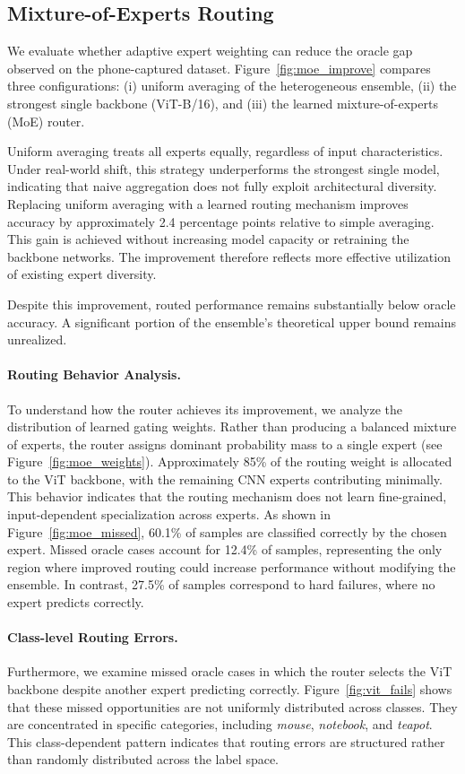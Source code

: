 \subsection{Mixture-of-Experts Routing}

We evaluate whether adaptive expert weighting can reduce the oracle gap observed on the phone-captured dataset.
Figure~\ref{fig:moe_improve} compares three configurations: (i) uniform averaging of the heterogeneous ensemble, (ii) the strongest single backbone (ViT-B/16), and (iii) the learned mixture-of-experts (MoE) router.

Uniform averaging treats all experts equally, regardless of input characteristics.
Under real-world shift, this strategy underperforms the strongest single model, indicating that naive aggregation does not fully exploit architectural diversity.
Replacing uniform averaging with a learned routing mechanism improves accuracy by approximately 2.4 percentage points relative to simple averaging.
This gain is achieved without increasing model capacity or retraining the backbone networks.
The improvement therefore reflects more effective utilization of existing expert diversity.

Despite this improvement, routed performance remains substantially below oracle accuracy.
A significant portion of the ensemble's theoretical upper bound remains unrealized.

\paragraph{Routing Behavior Analysis.}
To understand how the router achieves its improvement, we analyze the distribution of learned gating weights.
Rather than producing a balanced mixture of experts, the router assigns dominant probability mass to a single expert (see Figure~\ref{fig:moe_weights}).
Approximately 85\% of the routing weight is allocated to the ViT backbone, with the remaining CNN experts contributing minimally.
This behavior indicates that the routing mechanism does not learn fine-grained, input-dependent specialization across experts.
As shown in Figure~\ref{fig:moe_missed}, 60.1\% of samples are classified correctly by the chosen expert.
Missed oracle cases account for 12.4\% of samples, representing the only region where improved routing could increase performance without modifying the ensemble.
In contrast, 27.5\% of samples correspond to hard failures, where no expert predicts correctly.

\paragraph{Class-level Routing Errors.}
Furthermore, we examine missed oracle cases in which the router selects the ViT backbone despite another expert predicting correctly.
Figure~\ref{fig:vit_fails} shows that these missed opportunities are not uniformly distributed across classes.
They are concentrated in specific categories, including \textit{mouse}, \textit{notebook}, and \textit{teapot}.
This class-dependent pattern indicates that routing errors are structured rather than randomly distributed across the label space.

